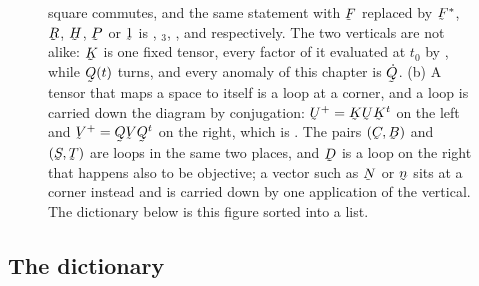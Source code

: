 \begin{figure}[htbp]
{square commutes, and the same statement with $\bF$ replaced by
$\bF^{*}$, $\bR$, $\bH$, $\bP$ or $\shift$ is , $_{3}$,
,  and  respectively. The two verticals are
not alike: $\bK$ is one fixed tensor, every factor of it evaluated at
$t_{0}$ by , while $\bQ(t)$ turns, and every anomaly of this
chapter is $\dot\bQ$. (b) A tensor that maps a space to itself is a loop
at a corner, and a loop is carried down the diagram by conjugation:
$\bU^{+}=\bK\bU\bK^{t}$ on the left and $\bV^{+}=\bQ\bV\bQ^{t}$ on the
right, which is . The pairs $(\bC,\bB)$ and $(\bS,\bT)$ are
loops in the same two places, and $\bD$ is a loop on the right that
happens also to be objective; a vector such as $\bN$ or $\bn$ sits at a
corner instead and is carried down by one application of the vertical.
The dictionary below is this figure sorted into a list.}
\label{fig:ch7square}
\end{figure}
\subsection*{The dictionary}

